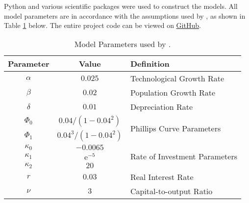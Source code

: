 \documentclass[12pt, centerh1]{article}
\begin{document}
Python \citep{rossum1995python} and various scientific packages were used to construct the models. All model parameters are in accordance with the assumptions used by \citet{grasselli2012analysis}, as shown in Table \ref{tab:parameters} below. The entire project code can be viewed on \href{https://github.com/grantwforsythe/Stats-6A03}{GitHub}.

\begin{table}[!h]
\caption{Model Parameters used by \citet{grasselli2012analysis}.}
\label{tab:parameters}
\centering
\begin{tabular}{|c|c|l|}
\hline
\textbf{Parameter }     & \textbf{Value}            & \textbf{Definition}                       \\
\hline
$\alpha$                & $0.025$                   & Technological Growth Rate                 \\
$\beta$                 & $0.02$                    & Population Growth Rate                    \\
$\delta$                & $0.01$                    & Depreciation Rate                 \\ \hline
$\Phi_0$                & $0.04/(1-0.04^2)$         & \multirow{2}{*}{Phillips Curve Parameters}\\
$\Phi_1$                & $0.04^3/(1-0.04^2)$       & ~                                 \\ \hline
$\kappa_0$             & $-0.0065$                 & \multirow{3}{*}{Rate of Investment Parameters}   \\
$\kappa_1$              & $\mathrm e^{-5}$          & ~                                         \\
$\kappa_2$              & $20$                      & ~                                 \\ \hline
$r$                     & $0.03$                    & Real Interest Rate                        \\
$\nu$                   & $3$                       & Capital-to-output Ratio                   \\
\hline
\end{tabular}
\end{table}
\end{document}
